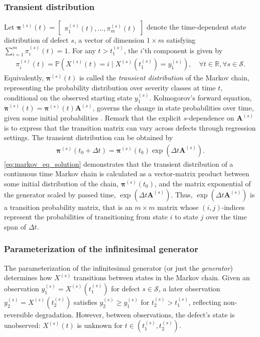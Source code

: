 \documentclass{article}
\begin{document}
\subsubsection{Transient distribution} \label{sec:transient_dist}
Let $\bm{\pi}^{(s)}(t) = \begin{bmatrix} \pi^{(s)}_1(t), \dots, \pi^{(s)}_m(t) \end{bmatrix}$ denote the time-dependent state distribution of defect $s$, a vector of dimension $1 \times m$ satisfying $\sum_{i = 1}^m \pi^{(s)}_i(t) = 1$. For any $t>t_1^{(s)}$, the $i$'th component is given by
\begin{align}
\pi_i^{(s)}(t) = \mathds{P} \left( X^{(s)}(t) = i \mid X^{(s)}(t_1^{(s)}) = y_1^{(s)}  \right), \quad \forall t\in \mathbb{R}, \forall s \in \mathcal{S}. \label{eq:transient_dist} 
\end{align}
Equivalently, $\bm{\pi}^{(s)}(t)$ is called the \textit{transient distribution} of the Markov chain, representing the probability distribution over severity classes at time $t$, conditional on the observed starting state $y_1^{(s)}$.
Kolmogorov's forward equation, $\Dot{\bm{\pi}}^{(s)}(t) = \bm{\pi}^{(s)}(t) \bm{A}^{(s)}$, governs the change in state probabilities over time, given some initial probabilities \citep[Section 1.3]{bladt_nielsen}. Remark that the explicit $s$-dependence on $\bm{A}^{(s)}$ is to express that the transition matrix can vary across defects through regression settings.
The transient distribution can be obtained by
\begin{equation}
\begin{aligned}
                  \bm{\pi}^{(s)}(t_0 + \Delta t) = 
                  \bm{\pi}^{(s)}(t_0) \exp{ ( \Delta t \bm{A}^{(s)} ) }. \label{eq:markov_eq_solution} \end{aligned}     
\end{equation}
\cref{eq:markov_eq_solution} demonstrates that the transient distribution of a continuous time Markov chain is calculated as a vector-matrix product between some initial distribution of the chain, $\bm{\pi}^{(s)}(t_0)$, and the matrix exponential of the generator scaled by passed time, $\exp{ ( \Delta t \bm{A}^{(s)} ) }$. Thus, $\exp{ ( \Delta t \bm{A}^{(s)} ) }$ is a transition probability matrix, that is an $m \times m$ matrix whose $(i,j)$-indices represent the probabilities of transitioning from state $i$ to state $j$ over the time span of $\Delta t$.

\subsubsection{Parameterization of the infinitesimal generator} \label{sec:generator_params}
The parameterization of the infinitesimal generator (or just the \textit{generator}) determines how $X^{(s)}$ transitions between states in the Markov chain. 
Given an observation $y_1^{(s)} = X^{(s)}\left(t_1^{(s)}\right)$ for defect $s \in \mathcal{S}$, a later observation $y_2^{(s)} = X^{(s)}\left(t_2^{(s)}\right)$ satisfies $y_2^{(s)} \geq y_1^{(s)}$ for $t_2^{(s)} > t_1^{(s)}$, reflecting non-reversible degradation. However, between observations, the defect’s state is unobserved: $X^{(s)}(t)$ is unknown for $t \in \left(t_1^{(s)}, t_2^{(s)}\right)$.
\end{document}
